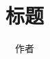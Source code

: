 \documentclass{ctexbeamer}
\begin{document}
    \title{标题}
    \author{作者}
    \maketitle

    
    
\end{document}
